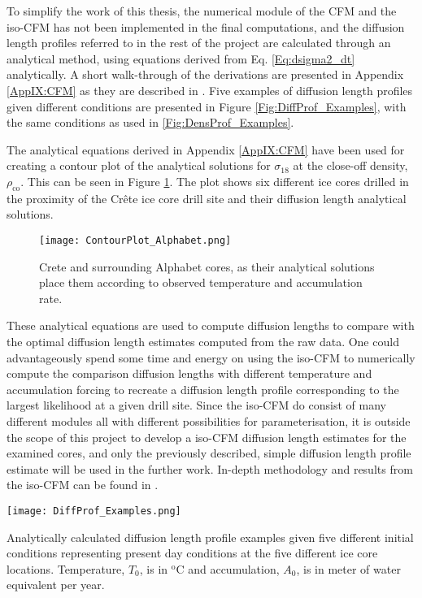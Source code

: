 \documentclass[../../CompleteThesis2/Complete_2ndDraft]{subfiles}
\begin{document}
To simplify the work of this thesis, the numerical module of the CFM and the iso-CFM has not been implemented in the final computations, and the diffusion length profiles referred to in the rest of the project are calculated through an analytical method, using equations derived from Eq. \ref{Eq:dsigma2_dt} analytically. A short walk-through of the derivations are presented in Appendix \ref{AppIX:CFM} as they are described in \cite[Gkinis et al., 2021]{Gkinis2021}. Five examples of diffusion length profiles given different conditions are presented in Figure \ref{Fig:DiffProf_Examples}, with the same conditions as used in \ref{Fig:DensProf_Examples}.

The analytical equations derived in Appendix \ref{AppIX:CFM} have been used for creating a contour plot of the analytical solutions for $\sigma_{18}$ at the close-off density, $\rho_{\text{co}}$. This can be seen in Figure \ref{Fig:ICE_ContourPlot}. The plot shows six different ice cores drilled in the proximity of the Crête ice core drill site and their diffusion length analytical solutions.

\begin{figure}
	\centering
	\texttt{[image: ContourPlot\_Alphabet.png]}
	\caption[Analytical solutions of diffusion length, Alphabet cores.]{\small Crete and surrounding Alphabet cores, as their analytical solutions place them according to observed temperature and accumulation rate.}
	\label{Fig:ICE_ContourPlot}
\end{figure}


These analytical equations are used to compute diffusion lengths to compare with the optimal diffusion length estimates computed from the raw data. One could advantageously spend some time and energy on using the iso-CFM to numerically compute the comparison diffusion lengths with different temperature and accumulation forcing to recreate a diffusion length profile corresponding to the largest likelihood at a given drill site. Since the iso-CFM do consist of many different modules all with different possibilities for parameterisation, it is outside the scope of this project to develop a iso-CFM diffusion length estimates for the examined cores, and only the previously described, simple diffusion length profile estimate will be used in the further work. In-depth methodology and results from the iso-CFM can be found in \cite[Gkinis et al., 2021]{Gkinis2021}.

\begin{marginfigure}
	\centering
	\texttt{[image: DiffProf\_Examples.png]}
	\caption[Five different analytical diffusion length profiles.]{\footnotesize Analytically calculated diffusion length profile examples given five different initial conditions representing present day conditions at the five different ice core locations. Temperature, $T_0$, is in $^{\text{o}}$C and accumulation, $A_0$, is in meter of water equivalent per year.}
	\label{Fig:DiffProf_Examples}
\end{marginfigure}
\end{document}

